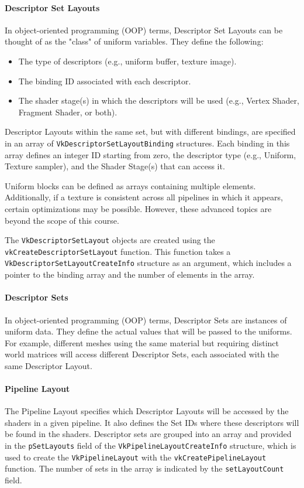 \paragraph*{Descriptor Set Layouts}
In object-oriented programming (OOP) terms, Descriptor Set Layouts can be thought of as the "class" of uniform variables. They define the following:
\begin{itemize}
    \item The type of descriptors (e.g., uniform buffer, texture image).
    \item The binding ID associated with each descriptor.
    \item The shader stage(s) in which the descriptors will be used (e.g., Vertex Shader, Fragment Shader, or both).
\end{itemize}

Descriptor Layouts within the same set, but with different bindings, are specified in an array of \texttt{VkDescriptorSetLayoutBinding} structures. 
Each binding in this array defines an integer ID starting from zero, the descriptor type (e.g., Uniform, Texture sampler), and the Shader Stage(s) that can access it.

Uniform blocks can be defined as arrays containing multiple elements. 
Additionally, if a texture is consistent across all pipelines in which it appears, certain optimizations may be possible. 
However, these advanced topics are beyond the scope of this course.

The \texttt{VkDescriptorSetLayout} objects are created using the \\\texttt{vkCreateDescriptorSetLayout} function.
This function takes a \\\texttt{VkDescriptorSetLayoutCreateInfo} structure as an argument, which includes a pointer to the binding array and the number of elements in the array.

\paragraph*{Descriptor Sets}
In object-oriented programming (OOP) terms, Descriptor Sets are instances of uniform data. 
They define the actual values that will be passed to the uniforms. 
For example, different meshes using the same material but requiring distinct world matrices will access different Descriptor Sets, each associated with the same Descriptor Layout.

\paragraph*{Pipeline Layout}
The Pipeline Layout specifies which Descriptor Layouts will be accessed by the shaders in a given pipeline. 
It also defines the Set IDs where these descriptors will be found in the shaders.
Descriptor sets are grouped into an array and provided in the \texttt{pSetLayouts} field of the \texttt{VkPipelineLayoutCreateInfo} structure, which is used to create the \texttt{VkPipelineLayout} with the \texttt{vkCreatePipelineLayout} function. 
The number of sets in the array is indicated by the \texttt{setLayoutCount} field.

